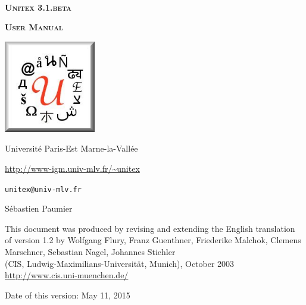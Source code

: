 
\begin{titlepage}
\begin{center}

~

\vspace{3cm}
\Huge
\textsc{\textbf{Unitex 3.1.beta}}

\vspace{1cm}

\huge
\textsc{\textbf{User Manual}}

\vspace{2cm}

  \begin{center}
    \includegraphics[width=4cm]{resources/img/logo-Unitex.png}
  \end{center}
\normalsize

\vspace{2cm}

\LARGE

Université Paris-Est Marne-la-Vallée
\bigskip
\normalsize

\url{http://www-igm.univ-mlv.fr/~unitex}

\verb$unitex@univ-mlv.fr$

\vspace{0.5cm}

Sébastien Paumier
\bigskip

This document was produced by revising and extending the English translation\\
of version 1.2 by Wolfgang Flury, Franz Guenthner, Friederike Malchok, Clemens Marschner, 
 Sebastian Nagel, Johannes Stiehler\\
 (CIS, Ludwig-Maximilians-Universit\"at, Munich), October 2003\\
\url{http://www.cis.uni-muenchen.de/}

\bigskip
Date of this version: May 11, 2015
\end{center}

\end{titlepage}
